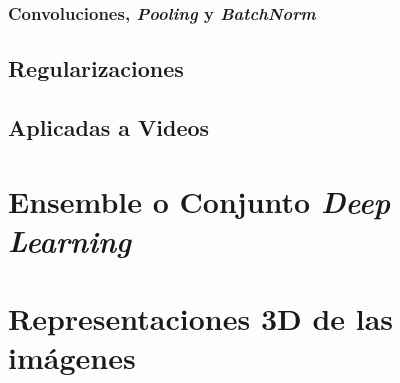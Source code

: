 \subsubsection{Convoluciones, \emph{Pooling} y \emph{BatchNorm}}
\subsection{Regularizaciones}
\subsection{Aplicadas a Videos} 
\section{Ensemble o Conjunto \emph{Deep Learning}}
\section{Representaciones 3D de las imágenes}
